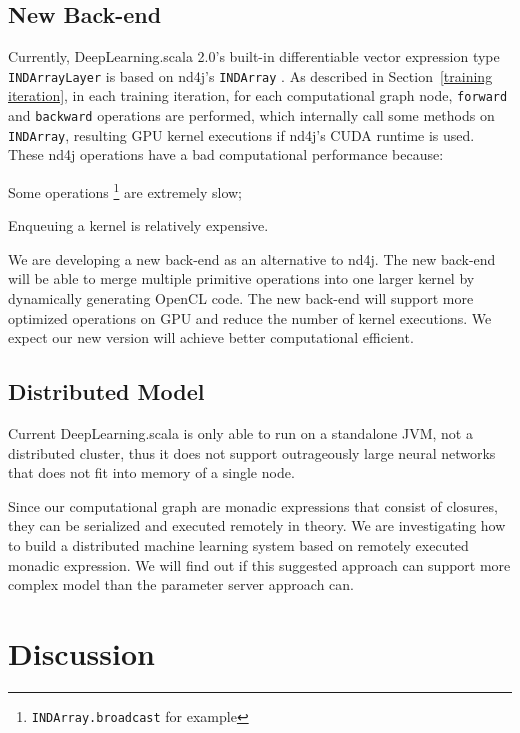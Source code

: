 \subsection{New Back-end}
Currently, DeepLearning.scala 2.0's built-in differentiable vector expression type \lstinline{INDArrayLayer} is based on nd4j's \lstinline{INDArray}  \cite{skymind2017nd4j}.
As described in Section~\ref{training iteration}, in each training iteration, for each \gls{computational graph} node, \lstinline{forward} and \lstinline{backward} operations are performed, which internally call some methods on \lstinline{INDArray}, resulting GPU kernel executions if nd4j's CUDA runtime is used. These nd4j operations have a bad computational performance because:
\begin{enumerate*}
  \item Some operations \footnote{\lstinline{INDArray.broadcast} for example} are extremely slow;
  \item Enqueuing a kernel is relatively expensive.
\end{enumerate*}

 We are developing a new back-end as an alternative to nd4j. The new back-end will be able to merge multiple primitive operations into one larger kernel by dynamically generating OpenCL code. The new back-end
 will support more optimized operations on GPU and reduce the number of kernel executions. We expect our new version will achieve better computational efficient.

\subsection{Distributed Model}

Current DeepLearning.scala is only able to run on a standalone JVM, not a distributed cluster, thus it does not support outrageously large neural networks \cite{shazeer2017outrageously} that does not fit into memory of a single node.

Since our \gls{computational graph} are monadic expressions that consist of closures, they can be serialized and executed remotely in theory. We are investigating how to build a distributed machine learning system based on remotely executed monadic expression. We will find out if this suggested approach can support more complex model than the parameter server approach can.




\section{Discussion}

